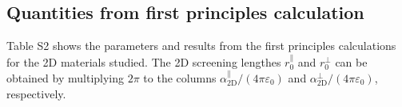 \documentclass[journal=ancac3,email=true,hyperref=true,keywords=false]{achemso}
\begin{document}
\subsection{Quantities from first principles calculation}

Table S2 shows the parameters and results from the
first principles calculations for the 2D materials studied. The 2D
screening lengthes $r_{0}^{\parallel}$ and $r_{0}^{\perp}$ can be
obtained by multiplying $2 \pi$ to the columns
$\alpha_{\mathrm{2D}}^{\parallel}/(4\pi \varepsilon_{0})$ and
$\alpha_{\mathrm{2D}}^{\perp}/(4\pi \varepsilon_{0})$, respectively.



\iffalse
\subsection{Density of States (DOS) plots for the materials studied}
\label{sec:DOS}




\subsection{Band structures of 2D materials calculated}
\label{sec:bs}


\fi

\clearpage{}
\section*{}
\label{sec:ref}

\end{document}
